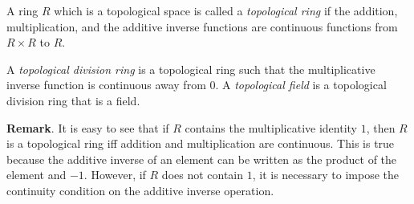 \documentclass[12pt]{article}
\begin{document}
A ring $R$ which is a topological space is called a \emph{topological ring} if the addition, multiplication, and the additive inverse functions are continuous functions from $R \times R$ to $R$.

A \emph{topological division ring} is a topological ring such that the multiplicative inverse function is continuous away from $0$.  A \emph{topological field} is a topological division ring that is a field.

\textbf{Remark}.  It is easy to see that if $R$ contains the multiplicative identity $1$, then $R$ is a topological ring iff addition and multiplication are continuous.  This is true because the additive inverse of an element can be written as the product of the element and $-1$.  However, if $R$ does not contain $1$, it is necessary to impose the continuity condition on the additive inverse operation.

\end{document}
